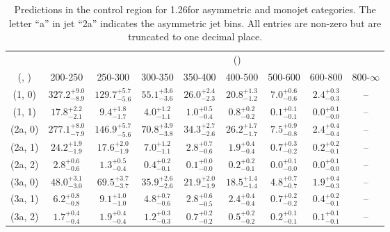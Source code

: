 \begin{table}[h!]
\tiny
\centering
\caption{Predictions in the \mmj control region for 1.26\ifb for asymmetric and monojet categories. The letter ``a'' in jet \eg ``2a''  indicates the asymmetric jet bins. All entries are non-zero but are truncated to one decimal place.\label{tab:predsep_mumu_ewk_asym}}
\begin{tabular}
{ccccccccc}
	\hline\hline
&	& \multicolumn{8}{c}{\scalht (\gev)} \\ 
	 (\njet,  \nb) & 200-250 & 250-300 & 300-350 & 350-400 & 400-500 & 500-600 & 600-800 & 800-$\infty$ \\ [0.8ex] 
\hline
	(1, 0) & $327.2^{+ 9.0 }_{- 8.9 }$ & $129.7^{+ 5.7 }_{- 5.6 }$ & $55.1^{+ 3.6 }_{- 3.6 }$ & $26.0^{+ 2.4 }_{- 2.3 }$ & $20.8^{+ 1.3 }_{- 1.2 }$ & $7.0^{+ 0.6 }_{- 0.6 }$ & $2.4^{+ 0.3 }_{- 0.3 }$ & -- \\[0.5ex] 
	(1, 1) & $17.8^{+ 2.2 }_{- 2.1 }$ & $9.4^{+ 1.8 }_{- 1.7 }$ & $4.0^{+ 1.2 }_{- 1.1 }$ & $1.0^{+ 0.5 }_{- 0.4 }$ & $0.8^{+ 0.2 }_{- 0.2 }$ & $0.1^{+ 0.1 }_{- 0.1 }$ & $0.0^{+ 0.1 }_{- 0.0 }$ & -- \\[0.5ex] 
	(2a, 0) & $277.1^{+ 8.0 }_{- 7.9 }$ & $146.9^{+ 5.7 }_{- 5.6 }$ & $70.8^{+ 3.9 }_{- 3.8 }$ & $34.3^{+ 2.7 }_{- 2.6 }$ & $26.2^{+ 1.7 }_{- 1.7 }$ & $7.5^{+ 0.9 }_{- 0.8 }$ & $2.4^{+ 0.4 }_{- 0.4 }$ & -- \\[0.5ex] 
	(2a, 1) & $24.2^{+ 1.9 }_{- 1.9 }$ & $17.6^{+ 2.0 }_{- 1.9 }$ & $7.0^{+ 1.2 }_{- 1.1 }$ & $2.8^{+ 0.7 }_{- 0.6 }$ & $1.9^{+ 0.4 }_{- 0.4 }$ & $0.7^{+ 0.3 }_{- 0.2 }$ & $0.2^{+ 0.2 }_{- 0.1 }$ & -- \\[0.5ex] 
	(2a, 2) & $2.8^{+ 0.6 }_{- 0.6 }$ & $1.3^{+ 0.5 }_{- 0.4 }$ & $0.4^{+ 0.2 }_{- 0.1 }$ & $0.1^{+ 0.0 }_{- 0.0 }$ & $0.2^{+ 0.2 }_{- 0.1 }$ & $0.0^{+ 0.1 }_{- 0.0 }$ & $0.0^{+ 0.1 }_{- 0.0 }$ & -- \\[0.5ex] 
	(3a, 0) & $48.0^{+ 3.1 }_{- 3.0 }$ & $69.5^{+ 3.7 }_{- 3.7 }$ & $35.9^{+ 2.6 }_{- 2.6 }$ & $21.9^{+ 2.0 }_{- 1.9 }$ & $18.5^{+ 1.4 }_{- 1.4 }$ & $4.8^{+ 0.7 }_{- 0.7 }$ & $1.9^{+ 0.4 }_{- 0.3 }$ & -- \\[0.5ex] 
	(3a, 1) & $6.2^{+ 0.8 }_{- 0.8 }$ & $9.1^{+ 1.0 }_{- 1.0 }$ & $4.8^{+ 0.7 }_{- 0.6 }$ & $2.8^{+ 0.6 }_{- 0.5 }$ & $2.4^{+ 0.4 }_{- 0.4 }$ & $0.7^{+ 0.2 }_{- 0.2 }$ & $0.4^{+ 0.2 }_{- 0.1 }$ & -- \\[0.5ex] 
	(3a, 2) & $1.7^{+ 0.4 }_{- 0.4 }$ & $1.9^{+ 0.4 }_{- 0.4 }$ & $1.2^{+ 0.3 }_{- 0.3 }$ & $0.7^{+ 0.2 }_{- 0.2 }$ & $0.5^{+ 0.2 }_{- 0.2 }$ & $0.2^{+ 0.1 }_{- 0.1 }$ & $0.1^{+ 0.1 }_{- 0.1 }$ & -- \\[0.5ex] 

\end{tabular}
\end{table}
